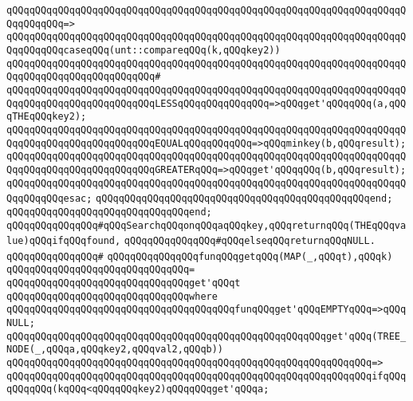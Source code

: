 \verb|qQQqqQQqqQQqqQQqqQQqqQQqqQQqqQQqqQQqqQQqqQQqqQQqqQQqqQQqqQQqqQQqqQQqqQQqqQQqqQQq=>|\newline
\verb|qQQqqQQqqQQqqQQqqQQqqQQqqQQqqQQqqQQqqQQqqQQqqQQqqQQqqQQqqQQqqQQqqQQqqQQqqQQqqQQqcaseqQQq(unt::compareqQQq(k,qQQqkey2))|\newline
\verb|qQQqqQQqqQQqqQQqqQQqqQQqqQQqqQQqqQQqqQQqqQQqqQQqqQQqqQQqqQQqqQQqqQQqqQQqqQQqqQQqqQQqqQQqqQQqqQQq#|\newline
\verb|qQQqqQQqqQQqqQQqqQQqqQQqqQQqqQQqqQQqqQQqqQQqqQQqqQQqqQQqqQQqqQQqqQQqqQQqqQQqqQQqqQQqqQQqqQQqqQQqLESSqQQqqQQqqQQqqQQq=>qQQqget'qQQqqQQq(a,qQQqTHEqQQqkey2);|\newline
\verb|qQQqqQQqqQQqqQQqqQQqqQQqqQQqqQQqqQQqqQQqqQQqqQQqqQQqqQQqqQQqqQQqqQQqqQQqqQQqqQQqqQQqqQQqqQQqqQQqEQUALqQQqqQQqqQQq=>qQQqminkey(b,qQQqresult);|\newline
\verb|qQQqqQQqqQQqqQQqqQQqqQQqqQQqqQQqqQQqqQQqqQQqqQQqqQQqqQQqqQQqqQQqqQQqqQQqqQQqqQQqqQQqqQQqqQQqqQQqGREATERqQQq=>qQQqget'qQQqqQQq(b,qQQqresult);|\newline
\verb|qQQqqQQqqQQqqQQqqQQqqQQqqQQqqQQqqQQqqQQqqQQqqQQqqQQqqQQqqQQqqQQqqQQqqQQqqQQqqQQqesac;|\newline
\verb|qQQqqQQqqQQqqQQqqQQqqQQqqQQqqQQqqQQqqQQqqQQqqQQqend;|\newline
\verb|qQQqqQQqqQQqqQQqqQQqqQQqqQQqqQQqend;|\newline
\newline
\verb|qQQqqQQqqQQqqQQq#qQQqSearchqQQqonqQQqaqQQqkey,qQQqreturnqQQq(THEqQQqvalue)qQQqifqQQqfound,|\newline
\verb|qQQqqQQqqQQqqQQq#qQQqelseqQQqreturnqQQqNULL.|\newline
\verb|qQQqqQQqqQQqqQQq#|\newline
\verb|qQQqqQQqqQQqqQQqfunqQQqgetqQQq(MAP(_,qQQqt),qQQqk)|\newline
\verb|qQQqqQQqqQQqqQQqqQQqqQQqqQQqqQQq=|\newline
\verb|qQQqqQQqqQQqqQQqqQQqqQQqqQQqqQQqget'qQQqt|\newline
\verb|qQQqqQQqqQQqqQQqqQQqqQQqqQQqqQQqwhere|\newline
\verb|qQQqqQQqqQQqqQQqqQQqqQQqqQQqqQQqqQQqqQQqfunqQQqget'qQQqEMPTYqQQq=>qQQqNULL;|\newline
\verb|qQQqqQQqqQQqqQQqqQQqqQQqqQQqqQQqqQQqqQQqqQQqqQQqqQQqqQQqget'qQQq(TREE_NODE(_,qQQqa,qQQqkey2,qQQqval2,qQQqb))|\newline
\verb|qQQqqQQqqQQqqQQqqQQqqQQqqQQqqQQqqQQqqQQqqQQqqQQqqQQqqQQqqQQqqQQq=>|\newline
\verb|qQQqqQQqqQQqqQQqqQQqqQQqqQQqqQQqqQQqqQQqqQQqqQQqqQQqqQQqqQQqqQQqifqQQqqQQqqQQq(kqQQq<qQQqqQQqkey2)qQQqqQQqget'qQQqa;|\newline
